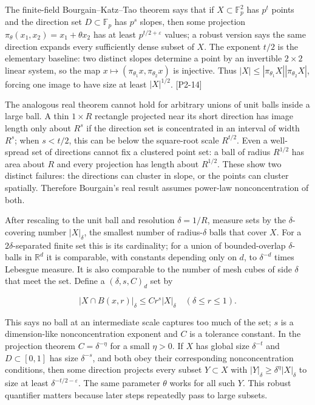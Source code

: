 \hypertarget{04-visual-computing-ii-ch033-why-the-euclidean-projection-theorem-needs-scale-regularity}{}

The finite-field Bourgain--Katz--Tao theorem says that if \(X\subset\mathbb F_p^2\) has \(p^t\) points and the direction set \(D\subset\mathbb F_p\) has \(p^s\) slopes, then some projection \(\pi_\theta(x_1,x_2)=x_1+\theta x_2\) has at least \(p^{t/2+\varepsilon}\) values; a robust version says the same direction expands every sufficiently dense subset of \(X\). The exponent \(t/2\) is the elementary baseline: two distinct slopes determine a point by an invertible \(2\times2\) linear system, so the map \(x\mapsto(\pi_{\theta_1}x,\pi_{\theta_2}x)\) is injective. Thus \(|X|\le |\pi_{\theta_1}X||\pi_{\theta_2}X|\), forcing one image to have size at least \(|X|^{1/2}\). {[}P2-14{]}

The analogous real theorem cannot hold for arbitrary unions of unit balls inside a large ball. A thin \(1\times R\) rectangle projected near its short direction has image length only about \(R^s\) if the direction set is concentrated in an interval of width \(R^s\); when \(s<t/2\), this can be below the square-root scale \(R^{t/2}\). Even a well-spread set of directions cannot fix a clustered point set: a ball of radius \(R^{1/2}\) has area about \(R\) and every projection has length about \(R^{1/2}\). These show two distinct failures: the directions can cluster in slope, or the points can cluster spatially. Therefore Bourgain's real result assumes power-law nonconcentration of both.

After rescaling to the unit ball and resolution \(\delta=1/R\), measure sets by the \(\delta\)-covering number \(|X|_\delta\), the smallest number of radius-\(\delta\) balls that cover \(X\). For a \(2\delta\)-separated finite set this is its cardinality; for a union of bounded-overlap \(\delta\)-balls in \(\mathbb R^d\) it is comparable, with constants depending only on \(d\), to \(\delta^{-d}\) times Lebesgue measure. It is also comparable to the number of mesh cubes of side \(\delta\) that meet the set. Define a \((\delta,s,C)_d\) set by

\[|X\cap B(x,r)|_\delta\le Cr^s|X|_\delta\quad(\delta\le r\le1).\]

This says no ball at an intermediate scale captures too much of the set; \(s\) is a dimension-like nonconcentration exponent and \(C\) is a tolerance constant. In the projection theorem \(C=\delta^{-\eta}\) for a small \(\eta>0\). If \(X\) has global size \(\delta^{-t}\) and \(D\subset[0,1]\) has size \(\delta^{-s}\), and both obey their corresponding nonconcentration conditions, then some direction projects every subset \(Y\subset X\) with \(|Y|_\delta\ge\delta^{\eta}|X|_\delta\) to size at least \(\delta^{-t/2-\varepsilon}\). The same parameter \(\theta\) works for all such \(Y\). This robust quantifier matters because later steps repeatedly pass to large subsets.

